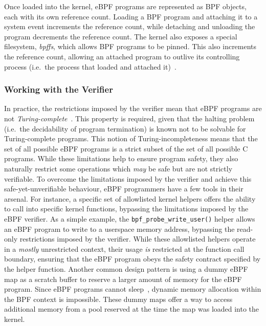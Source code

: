 Once loaded into the kernel, eBPF programs are represented as BPF objects, each with its
own reference count. Loading a BPF program and attaching it to a system event increments
the reference count, while detaching and unloading the program decrements the reference
count. The kernel also exposes a special filesystem, \textit{bpffs}, which allows BPF
programs to be pinned. This also increments the reference count, allowing an attached
program to outlive its controlling process (i.e.~the process that loaded and attached
it)~\cite{gregg2019_bpf}.

\subsubsection*{Working with the Verifier}

In practice, the restrictions imposed by the verifier mean that eBPF programs are not
\textit{Turing-complete}~\cite{gregg2019_bpf}.  This property is required, given that the
halting problem (i.e.~the decidability of program termination) is known not to be solvable
for Turing-complete programs. This notion of Turing-incompleteness means that the set of
all possible eBPF programs is a strict subset of the set of all possible C programs. While
these limitations help to ensure program safety, they also naturally restrict some
operations which \textit{may} be safe but are not strictly verifiable. To overcome the
limitations imposed by the verifier and achieve this safe-yet-unverifiable behaviour, eBPF
programmers have a few tools in their arsenal. For instance, a specific set of allowlisted
kernel helpers offers the ability to call into specific kernel functions, bypassing the
limitations imposed by the eBPF verifier. As a simple example, the
\texttt{bpf\_probe\_write\_user()} helper allows an eBPF program to write to a userspace
memory address, bypassing the read-only restrictions imposed by the verifier. While these
allowlisted helpers operate in a \textit{mostly} unrestricted context, their usage
\textit{is} restricted at the function call boundary, ensuring that the eBPF program obeys
the safety contract specified by the helper function.  Another common design pattern is
using a dummy eBPF map as a scratch buffer to reserve a larger amount of memory for the
eBPF program.  Since eBPF programs cannot sleep~\cite{gregg2019_bpf}, dynamic memory
allocation within the BPF context is impossible. These dummy maps offer a way to access
additional memory from a pool reserved at the time the map was loaded into the kernel.

